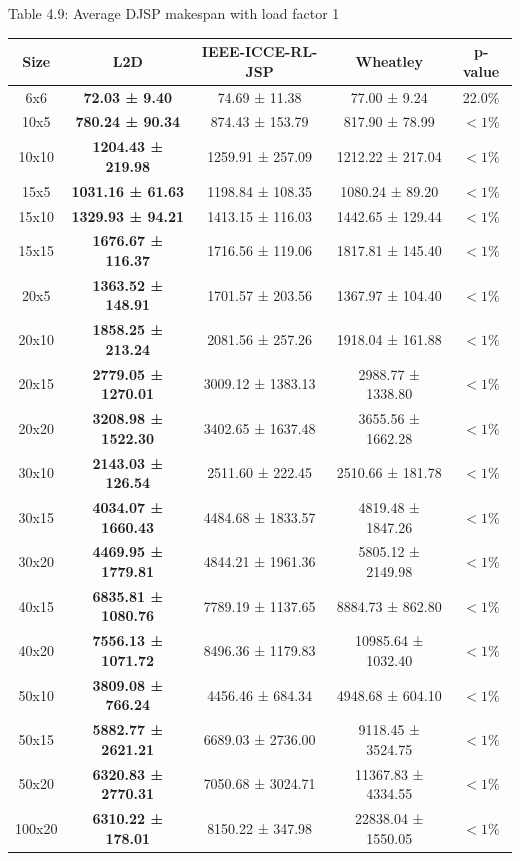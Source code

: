 \begin{table}
    Table 4.9: Average DJSP makespan with load factor 1\\
    \vspace{1mm}
    \label{table:4.6}
    \footnotesize 
    \begin{tabular}{ccccc}
        \toprule
        Size & L2D & IEEE-ICCE-RL-JSP & Wheatley & p-value \\
        \midrule
        6x6 & \textbf{72.03 ± 9.40} & 74.69 ± 11.38 & 77.00 ± 9.24 & 22.0$\%$ \\
        10x5 & \textbf{780.24 ± 90.34} & 874.43 ± 153.79 & 817.90 ± 78.99 & $< 1\%$ \\
        10x10 & \textbf{1204.43 ± 219.98} & 1259.91 ± 257.09 & 1212.22 ± 217.04 & $< 1\%$ \\
        15x5 & \textbf{1031.16 ± 61.63} & 1198.84 ± 108.35 & 1080.24 ± 89.20 & $< 1\%$ \\
        15x10 & \textbf{1329.93 ± 94.21} & 1413.15 ± 116.03 & 1442.65 ± 129.44 & $< 1\%$ \\
        15x15 & \textbf{1676.67 ± 116.37} & 1716.56 ± 119.06 & 1817.81 ± 145.40 & $< 1\%$ \\
        20x5 & \textbf{1363.52 ± 148.91} & 1701.57 ± 203.56 & 1367.97 ± 104.40 & $< 1\%$ \\
        20x10 & \textbf{1858.25 ± 213.24} & 2081.56 ± 257.26 & 1918.04 ± 161.88 & $< 1\%$ \\
        20x15 & \textbf{2779.05 ± 1270.01} & 3009.12 ± 1383.13 & 2988.77 ± 1338.80 & $< 1\%$ \\
        20x20 & \textbf{3208.98 ± 1522.30} & 3402.65 ± 1637.48 & 3655.56 ± 1662.28 & $< 1\%$ \\
        30x10 & \textbf{2143.03 ± 126.54} & 2511.60 ± 222.45 & 2510.66 ± 181.78 & $< 1\%$ \\
        30x15 & \textbf{4034.07 ± 1660.43} & 4484.68 ± 1833.57 & 4819.48 ± 1847.26 & $< 1\%$ \\
        30x20 & \textbf{4469.95 ± 1779.81} & 4844.21 ± 1961.36 & 5805.12 ± 2149.98 & $< 1\%$ \\
        40x15 & \textbf{6835.81 ± 1080.76} & 7789.19 ± 1137.65 & 8884.73 ± 862.80 & $< 1\%$ \\
        40x20 & \textbf{7556.13 ± 1071.72} & 8496.36 ± 1179.83 & 10985.64 ± 1032.40 & $< 1\%$ \\
        50x10 & \textbf{3809.08 ± 766.24} & 4456.46 ± 684.34 & 4948.68 ± 604.10 & $< 1\%$ \\
        50x15 & \textbf{5882.77 ± 2621.21} & 6689.03 ± 2736.00 & 9118.45 ± 3524.75 & $< 1\%$ \\
        50x20 & \textbf{6320.83 ± 2770.31} & 7050.68 ± 3024.71 & 11367.83 ± 4334.55 & $< 1\%$ \\
        100x20 & \textbf{6310.22 ± 178.01} & 8150.22 ± 347.98 & 22838.04 ± 1550.05 & $< 1\%$ \\
        \bottomrule
    \end{tabular}
\end{table}
    
